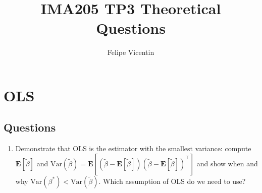 \documentclass{article}
\title{IMA205 \- TP3 Theoretical Questions}
\author{Felipe Vicentin}
\begin{document}
    \maketitle

    \section*{OLS}

    \subsection*{Questions}
    \begin{enumerate}
        \item Demonstrate that OLS is the estimator with the smallest variance: compute $\mathbf{E}[\tilde{\beta}]$ and $\text{Var}(\tilde{\beta}) = \mathbf{E}[(\tilde{\beta} - \mathbf{E}[\tilde{\beta}]){(\tilde{\beta} - \mathbf{E}[\tilde{\beta}])}^\top]$ and show when and why $\text{Var}(\beta^*) < \text{Var}(\tilde{\beta})$. Which assumption of OLS do we need to use?
    \end{enumerate}
\end{document}
